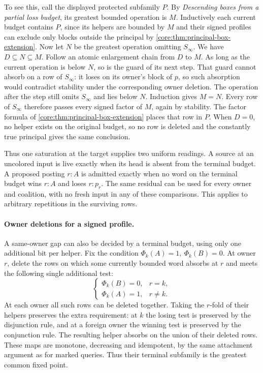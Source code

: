 To see this, call the displayed protected subfamily
$P$. By \emph{Descending boxes from a partial loss
budget}, its greatest bounded operation is $M$.
Inductively each current budget contains $P$,
since its helpers are bounded by $M$ and their
signed profiles can exclude only blocks outside
the principal by
\cref{core:thm:principal-box-extension}.
Now let $N$ be the greatest operation omitting
$S_\infty$. We have $D\subseteq N\subseteq M$.
Follow an atomic enlargement chain from $D$ to
$M$. As long as the current operation is below
$N$, so is the guard of its next step. That guard
cannot absorb on a row of $S_\infty$: it loses
on its owner's block of $p$, so such absorption
would contradict stability under the corresponding
owner deletion. The operation after the step still
omits $S_\infty$ and lies below $N$. Induction gives
$M=N$. Every row of $S_\infty$ therefore passes
every signed factor of $M$, again by stability.
The factor formula of
\cref{core:thm:principal-box-extension} places that
row in $P$. When $D=0$, no helper exists on the
original budget, so no row is deleted and the
constantly true principal gives the same conclusion.

Thus one saturation at the target supplies two
uniform readings. A source at an uncolored input
is live exactly when its head is absent from the
terminal budget. A proposed posting $r:A$ is
admitted exactly when no word on the terminal
budget wins $r:A$ and loses $r:p_r$. The same
residual can be used for every owner and coalition,
with no fresh input in any of these comparisons.
This applies to arbitrary repetitions in the
surviving rows.

\paragraph{Owner deletions for a signed profile.}
A same-owner gap can also be decided by a terminal
budget, using only one additional bit per helper.
Fix the condition $\Phi_k(A)=1,\ \Phi_k(B)=0$.
At owner $r$, delete the rows on which some
currently bounded word absorbs at $r$ and meets
the following single additional test:
\[
 \begin{cases}
 \Phi_k(B)=0,&r=k,\\
 \Phi_k(A)=1,&r\ne k .
 \end{cases}
\]
At each owner all such rows can be deleted together.
Taking the $r$-fold of their helpers preserves the
extra requirement: at $k$ the losing test is
preserved by the disjunction rule, and at a foreign
owner the winning test is preserved by the
conjunction rule. The resulting helper absorbs on
the union of their deleted rows. These maps are
monotone, decreasing and idempotent, by the same
attachment argument as for marked queries. Thus
their terminal subfamily is the greatest common
fixed point.

